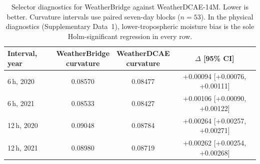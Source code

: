 \begin{table}[!ht]
\centering
\caption{Selector diagnostics for WeatherBridge against WeatherDCAE-14M. Lower is better. Curvature intervals use paired seven-day blocks ($n=53$). In the physical diagnostics (Supplementary Data~1), lower-tropospheric moisture bias is the sole Holm-significant regression in every row.}
\label{tab:selector-diagnostics}
\small
\setlength{\tabcolsep}{3pt}
\begin{tabular}{@{}lccc@{}}
\toprule
Interval, year & \shortstack{WeatherBridge\\curvature} & \shortstack{WeatherDCAE\\curvature} & $\Delta$ [95\% CI] \\
\midrule
6\,h, 2020 & 0.08570 & 0.08477 & +0.00094 [+0.00076, +0.00111] \\
6\,h, 2021 & 0.08533 & 0.08427 & +0.00106 [+0.00090, +0.00122] \\
12\,h, 2020 & 0.09048 & 0.08784 & +0.00264 [+0.00257, +0.00271] \\
12\,h, 2021 & 0.08980 & 0.08719 & +0.00262 [+0.00254, +0.00268] \\
\bottomrule
\end{tabular}
\end{table}
